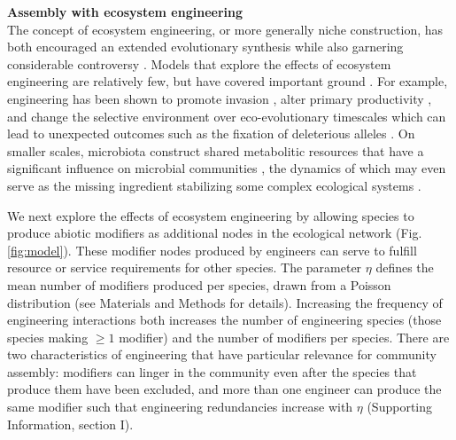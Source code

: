 \documentclass[9pt,twocolumn,twoside]{pnas-new}
\begin{document}
\vspace{-3mm}
\noindent \textbf{Assembly with ecosystem engineering}\\
The concept of ecosystem engineering, or more generally niche construction, has both encouraged an extended evolutionary synthesis \cite{Laland2015} while also garnering considerable controversy \cite{Gupta2017,Feldman2017}.
Models that explore the effects of ecosystem engineering are relatively few, but have covered important ground \cite{Hastings2007,OdlingSmee2013}.
For example, engineering has been shown to promote invasion \cite{Cuddington2004}, alter primary productivity \cite{Wright2004}, and change the selective environment over eco-evolutionary timescales \cite{Kylafis2008,Krakauer2009} which can lead to unexpected outcomes such as the fixation of deleterious alleles \cite{Laland1999}.
On smaller scales, microbiota construct shared metabolitic resources that have a significant influence on microbial communities \cite{Kallus2017}, the dynamics of which may even serve as the missing ingredient stabilizing some complex ecological systems \cite{Muscarella2017}.


We next explore the effects of ecosystem engineering by allowing species to produce abiotic modifiers as additional nodes in the ecological network (Fig. \ref{fig:model}).
These modifier nodes produced by engineers can serve to fulfill resource or service requirements for other species.
The parameter $\eta$ defines the mean number of modifiers produced per species, drawn from a Poisson distribution (see Materials and Methods for details).
Increasing the frequency of engineering interactions both increases the number of engineering species (those species making $\geq 1$ modifier) and the number of modifiers per species.
There are two characteristics of engineering that have particular relevance for community assembly:
modifiers can linger in the community even after the species that produce them have been excluded, and
more than one engineer can produce the same modifier such that engineering redundancies increase with $\eta$ (Supporting Information, section I).
\end{document}
